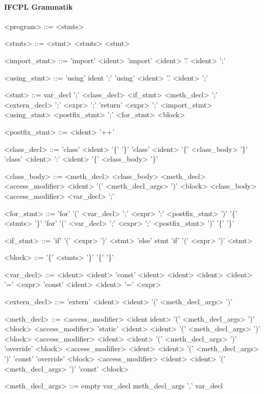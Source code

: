 \documentclass{article}
\begin{document}
\paragraph{IFCPL Grammatik}
\begin{grammar}

<program> ::= <stmts>

<stmts> ::= <stmt>
\alt <stmts> <stmt>

<import_stmt> ::= 'import' <ident>
\alt 'import' <ident> '.' <ident> ';'

<using_stmt> ::= 'using' ident ';'
\alt 'using' <ident> '.' <ident> ';'

<stmt> ::= var_decl ';' \alt <class_decl> \alt <if_stmt> \alt <meth_decl> ';'
\alt <extern_decl> ';'
\alt <expr> ';' 
\alt 'return' <expr> ';' 
\alt <import_stmt>
\alt <using_stmt>
\alt <postfix_stmt> ';'
\alt <for_stmt>
\alt <block>

<postfix_stmt> ::= <ident> '++'
	
<class_decl> ::= 'class' <ident> '\{' '\}'
\alt 'class' <ident> '\{' <class_body> '\}'
\alt 'class' <ident> ':' <ident> '\{' <class_body> '\}'


<class_body> ::= <meth_decl>
\alt <class_body> <meth_decl>
\alt <access_modifier> <ident> '(' <meth_decl_args> ')' <block>
\alt <class_body> <access_modifier> <var_decl> ';' 

<for_stmt> ::=	'for' '(' <var_decl> ';' <expr> ';' <postfix_stmt> ')' '\{' <stmts> '\}' 
\alt 'for' '(' <var_decl> ';' <expr> ';' <postfix_stmt> ')' '\{'  '\}' 

<if_stmt> ::= 'if' '(' <expr> ')' <stmt> 'else' stmt 
\alt 'if' '(' <expr> ')' <stmt>

<block> ::= '\{' <stmts> '\}'
\alt '\{' '\}'

<var_decl> ::= <ident> <ident>
\alt 'const' <ident> <ident>
\alt <ident> <ident> '=' <expr>
\alt 'const' <ident> <ident> '=' <expr>

<extern_decl> ::= 'extern' <ident> <ident> '(' <meth_decl_args> ')'

<meth_decl> ::= <access_modifier> <ident ident> '(' <meth_decl_args> ')' <block>
\alt <access_modifier> 'static' <ident> <ident> '(' <meth_decl_args> ')' <block>
\alt <access_modifier> <ident> <ident> '(' <meth_decl_args> ')' 'override' <block>
\alt <access_modifier> <ident> <ident> '(' <meth_decl_args> ')' 'const' 'override' <block>
\alt <access_modifier> <ident> <ident> '(' <meth_decl_args> ')' 'const' <block>

<meth_decl_args> ::= empty 
\alt var_decl 
\alt meth_decl_args ',' var_decl


\end{grammar}
\end{document}
